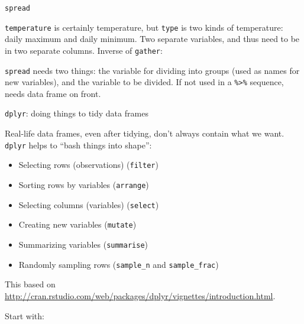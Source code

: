 \begin{frame}[fragile]{\texttt{spread}}

\texttt{temperature} is certainly temperature, but \texttt{type}
is two kinds of temperature: daily maximum and 
daily minimum. Two separate variables, and thus need to be
in two separate columns. Inverse of \texttt{gather}:

\begin{knitrout}
\color{fgcolor}
\end{knitrout}

\texttt{spread} needs two things: the variable for dividing into
groups (used as names for new variables), and the variable to be
divided. If not used in a \texttt{\%>\%} sequence, needs data frame on
front. 

\end{frame}

\begin{frame}[fragile]{\texttt{dplyr}: doing things to tidy data frames}
  
  Real-life data frames, even after tidying, don't always  contain
  what we want. \texttt{dplyr} helps to ``bash things into shape'':
  
  \begin{itemize}
  \item Selecting rows (observations) (\texttt{filter})
  \item Sorting rows by variables (\texttt{arrange})
  \item Selecting columns (variables) (\texttt{select})
  \item Creating new variables (\texttt{mutate})
  \item Summarizing variables (\texttt{summarise})
  \item Randomly sampling rows (\texttt{sample\_n} and \texttt{sample\_frac})
  \end{itemize}
  
  This based on \url{http://cran.rstudio.com/web/packages/dplyr/vignettes/introduction.html}.

  Start with:
\begin{knitrout}
\color{fgcolor}\begin{kframe}
\begin{alltt}
\end{alltt}
\end{kframe}
\end{knitrout}

\end{frame}


